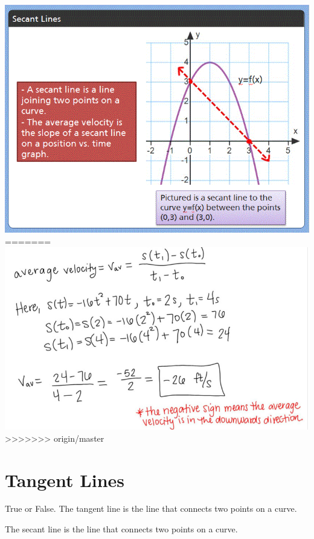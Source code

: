 \documentclass{ximera}
\begin{document}

\begin{image}
\includegraphics{picture5.gif}
=======
\includegraphics{picture2.jpg}
>>>>>>> origin/master
\end{image}

\section{Tangent Lines}


\begin{question}
  True or False. The tangent line is the line that connects two points on a curve. 
  \begin{multipleChoice}
  \end{multipleChoice}
  \begin{feedback}
  The secant line is the line that connects two points on a curve.
  \end{feedback}
\end{question}
\end{document}
